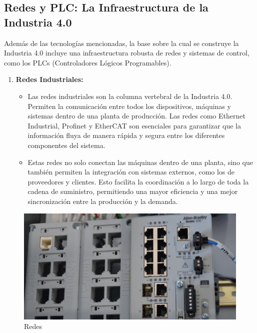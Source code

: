 \documentclass[
  letterpaper,
]{book}
\providecommand{\tightlist}{%
  \setlength{\itemsep}{0pt}\setlength{\parskip}{0pt}}\usepackage{longtable,booktabs,array}
\begin{document}
\subsection{Redes y PLC: La Infraestructura de la Industria
4.0}\label{redes-y-plc-la-infraestructura-de-la-industria-4.0}

Además de las tecnologías mencionadas, la base sobre la cual se
construye la Industria 4.0 incluye una infraestructura robusta de redes
y sistemas de control, como los PLCs (Controladores Lógicos
Programables).

\begin{enumerate}
\def\labelenumi{\arabic{enumi}.}
\tightlist
\item
  \textbf{Redes Industriales:}

  \begin{itemize}
  \tightlist
  \item
    Las redes industriales son la columna vertebral de la Industria 4.0.
    Permiten la comunicación entre todos los dispositivos, máquinas y
    sistemas dentro de una planta de producción. Las redes como Ethernet
    Industrial, Profinet y EtherCAT son esenciales para garantizar que
    la información fluya de manera rápida y segura entre los diferentes
    componentes del sistema.
  \item
    Estas redes no solo conectan las máquinas dentro de una planta, sino
    que también permiten la integración con sistemas externos, como los
    de proveedores y clientes. Esto facilita la coordinación a lo largo
    de toda la cadena de suministro, permitiendo una mayor eficiencia y
    una mejor sincronización entre la producción y la demanda.
  \end{itemize}
\end{enumerate}

\begin{figure}[H]

{\centering \includegraphics{Img/ethernet.png}

}

\caption{Redes}

\end{figure}%
\end{document}

